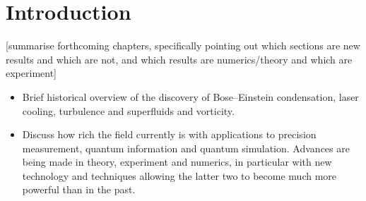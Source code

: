 \chapter{Introduction}

[summarise forthcoming chapters, specifically pointing out which sections are new results and which are not, and which results are numerics/theory and which are experiment]

\begin{itemize}
\item Brief historical overview of the discovery of Bose–Einstein condensation, laser cooling, turbulence and superfluids and vorticity.

\item Discuss how rich the field currently is with applications to precision measurement, quantum information and quantum simulation. Advances are being made in theory, experiment and numerics, in particular with new technology and techniques allowing the latter two to become much more powerful than in the past.
\end{itemize}
